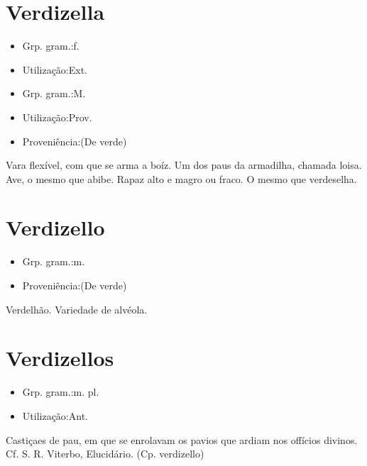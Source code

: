 \documentclass{article}
\begin{document}
\section{Verdizella}
\begin{itemize}
\item {Grp. gram.:f.}
\end{itemize}
\begin{itemize}
\item {Utilização:Ext.}
\end{itemize}
\begin{itemize}
\item {Grp. gram.:M.}
\end{itemize}
\begin{itemize}
\item {Utilização:Prov.}
\end{itemize}
\begin{itemize}
\item {Proveniência:(De \textunderscore verde\textunderscore )}
\end{itemize}
Vara flexível, com que se arma a boíz.
Um dos paus da armadilha, chamada loisa.
Ave, o mesmo que \textunderscore abibe\textunderscore .
Rapaz alto e magro ou fraco.
O mesmo que \textunderscore verdeselha\textunderscore .
\section{Verdizello}
\begin{itemize}
\item {Grp. gram.:m.}
\end{itemize}
\begin{itemize}
\item {Proveniência:(De \textunderscore verde\textunderscore )}
\end{itemize}
Verdelhão.
Variedade de alvéola.
\section{Verdizellos}
\begin{itemize}
\item {Grp. gram.:m. pl.}
\end{itemize}
\begin{itemize}
\item {Utilização:Ant.}
\end{itemize}
Castiçaes de pau, em que se enrolavam os pavios que ardiam nos offícios divinos. Cf. S. R. Viterbo, \textunderscore Elucidário\textunderscore .
(Cp. \textunderscore verdizello\textunderscore )
\end{document}
